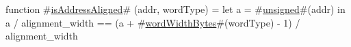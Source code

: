 function #\hyperref[zisAddressAligned]{isAddressAligned}# (addr, wordType) =
  let a = #\hyperref[zunsigned]{unsigned}#(addr) in
  a / alignment_width == (a + #\hyperref[zwordWidthBytes]{wordWidthBytes}#(wordType) - 1) / alignment_width
